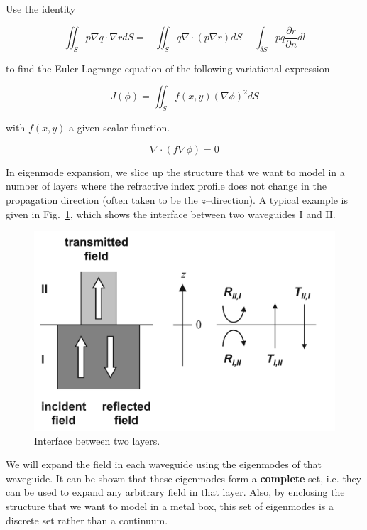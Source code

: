 \begin{exer}
Use the identity

$$\iint_S p \nabla q \cdot \nabla r dS= - \iint_S q \nabla \cdot (p \nabla r) dS + \int_{\delta S} pq \frac{\partial r}{\partial n} dl$$

to find the Euler-Lagrange equation of the following variational expression

$$J(\phi)=\iint_S f(x,y) (\nabla \phi)^2 dS$$

with $f(x,y)$ a given scalar function.

\begin{sol}
$$\nabla \cdot \left( f \nabla \phi \right) = 0 $$
\end{sol}
\end{exer}


\pagebreak



In eigenmode expansion, we slice up the structure that we want to model in a number of layers where the refractive index profile does not change in the propagation direction (often taken to be the $z$--direction). A typical example is given in Fig.~\ref{fig-interface}, which shows the interface between two waveguides I and II.

\begin{figure}[ht]
\centering
\includegraphics{numeric/figures/interface}
\caption{Interface between two layers.}
\label{fig-interface}
\end{figure}

We will expand the field in each waveguide using the eigenmodes of that waveguide. It can be shown that these eigenmodes form a \textbf{complete} set, i.e. they can be used to expand any arbitrary field in that layer. Also, by enclosing the structure that we want to model in a metal box, this set of eigenmodes is a discrete set rather than a continuum.

